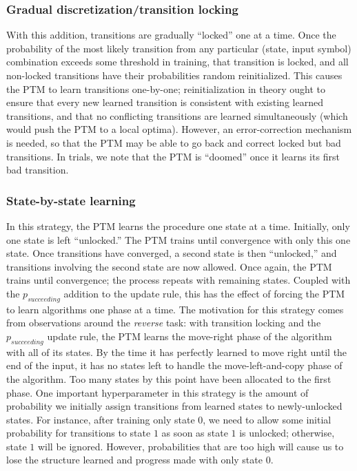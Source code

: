 \documentclass{article}
\begin{document}
\subsubsection{Gradual discretization/transition locking}
With this addition, transitions are gradually ``locked'' one at a time. Once the probability of the most likely transition from any particular (state, input symbol) combination exceeds some threshold in training, that transition is locked, and all non-locked transitions have their probabilities random reinitialized. This causes the PTM to learn transitions one-by-one; reinitialization in theory ought to ensure that every new learned transition is consistent with existing learned transitions, and that no conflicting transitions are learned simultaneously (which would push the PTM to a local optima). However, an error-correction mechanism is needed, so that the PTM may be able to go back and correct locked but bad transitions. In trials, we note that the PTM is ``doomed'' once it learns its first bad transition.

\subsubsection{State-by-state learning}
In this strategy, the PTM learns the procedure one state at a time. Initially, only one state is left ``unlocked.'' The PTM trains until convergence with only this one state. Once transitions have converged, a second state is then ``unlocked,'' and transitions involving the second state are now allowed. Once again, the PTM trains until convergence; the process repeats with remaining states. Coupled with the $p_{succeeding}$ addition to the update rule, this has the effect of forcing the PTM to learn algorithms one phase at a time. 
The motivation for this strategy comes from observations around the \textit{reverse} task: with transition locking and the $p_{succeeding}$ update rule, the PTM learns the move-right phase of the algorithm with all of its states. By the time it has perfectly learned to move right until the end of the input, it has no states left to handle the move-left-and-copy phase of the algorithm. Too many states by this point have been allocated to the first phase.
One important hyperparameter in this strategy is the amount of probability we initially assign transitions from learned states to newly-unlocked states. For instance, after training only state $0$, we need to allow some initial probability for transitions to state $1$ as soon as state $1$ is unlocked; otherwise, state $1$ will be ignored. However, probabilities that are too high will cause us to lose the structure learned and progress made with only state $0$.  
\end{document}
